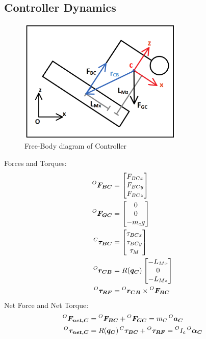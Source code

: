 \subsection{Controller Dynamics}
\begin{figure}[H]
\centering
\includegraphics[width=0.7\textwidth]{./Wilson_img/C_mm.png}
\caption{Free-Body diagram of Controller}
\end{figure}
Forces and Torques:
\begin{align*}
  \prescript{O}{}{\bm{F_{BC}}} &=
  \begin{bmatrix}
    F_{BCx} \\ F_{BCy} \\ F_{BCz}
  \end{bmatrix} \\
  \prescript{O}{}{\bm{F_{GC}}} &=
  \begin{bmatrix}
    0 \\ 0 \\ -m_c g
  \end{bmatrix} \\
  \prescript{C}{}{\bm{\tau_{BC}}} &=
  \begin{bmatrix}
    \tau_{BCx} \\ \tau_{BCy} \\ \tau_{M} 
  \end{bmatrix} \\
  \prescript{O}{}{\bm{r_{CB}}} &= R(\bm{q_C}) \begin{bmatrix}
                                   -L_{Mx} \\ 0 \\ -L_{Mz}
                                 \end{bmatrix} \\
  \prescript{O}{}{\bm{\tau_{RF}}} &=  \prescript{O}{}{\bm{r_{CB}}} \times \prescript{O}{}{\bm{F_{BC}}}
\end{align*}
Net Force and Net Torque:
\begin{align}
  \prescript{O}{}{\bm{F_{net, C}}} &= \prescript{O}{}{\bm{F_{BC}}} + \prescript{O}{}{\bm{F_{GC}}} = m_C \prescript{O}{}{\bm{a_C}} \\
  \prescript{O}{}{\bm{\tau_{net, C}}} &= R(\bm{q_C})\prescript{C}{}{\bm{\tau_{BC}}} + \prescript{O}{}{\bm{\tau_{RF}}} = \prescript{O}{}{I_c} \prescript{O}{}{\bm{\alpha_C}}
\end{align}
